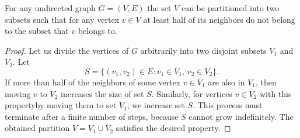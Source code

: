 \subproblem
\begin{theorem}
    For any undirected graph $G=(V,E)$ the set $V$ can be partitioned into two subsets such that for any vertex $v\in V$ at least half of its neighbors do not belong to the subset that $v$ belongs to.
\end{theorem}

\begin{proof}
    Let us divide the vertices of $G$ arbitrarily into two disjoint subsets $V_1$ and $V_2$.
    Let
    \[
        S = \{(v_1,v_2)\in E:v_1\in V_1,\,v_2\in V_2\}.
    \]
    If more than half of the neighbors of some vertex $v\in V_1$ are also in $V_1$, then moving $v$ to $V_2$ increases the size of set $S$.
    Similarly, for vertices $v\in V_2$ with this property\dash by moving them to set $V_1$, we increase set $S$.
    This process must terminate after a finite number of steps, because $S$ cannot grow indefinitely.
    The obtained partition $V=V_1\cup V_2$ satisfies the desired property.
\end{proof}
